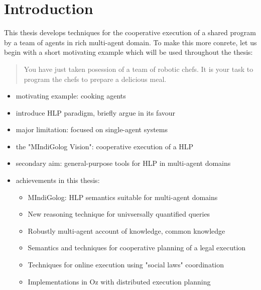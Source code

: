 \chapter{Introduction}

This thesis develops techniques for the cooperative execution of a shared 
program by a team of agents in rich multi-agent domain.  To make this more 
conrete, let us begin with a short motivating example which will be used 
throughout the thesis:

\begin{quote}
You have just taken posession of a team of robotic chefs.  It is your 
task to program the chefs to prepare a delicious meal.
\end{quote} 



\begin{itemize}
\item motivating example: cooking agents
\item introduce HLP paradigm, briefly argue in its favour
\item major limitation: focused on single-agent systems
\item the "MIndiGolog Vision": cooperative execution of a HLP
\item secondary aim: general-purpose tools for HLP in multi-agent domains
\item achievements in this thesis:
  \begin{itemize}
  \item MIndiGolog: HLP semantics suitable for multi-agent domains
  \item New reasoning technique for univsersally quantified queries
  \item Robustly multi-agent account of knowledge, common knowledge
  \item Semantics and techniques for cooperative planning of a legal execution
  \item Techniques for online execution using "social laws" coordination
  \item Implementations in Oz with distributed execution planning
  \end{itemize}
\end{itemize}

